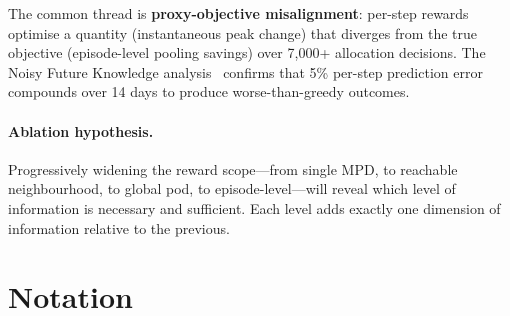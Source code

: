 \documentclass[11pt]{article}
\begin{document}
\noindent
The common thread is \textbf{proxy-objective misalignment}: per-step rewards
optimise a quantity (instantaneous peak change) that diverges from the true
objective (episode-level pooling savings) over 7{,}000+ allocation
decisions.  The Noisy Future Knowledge analysis~\cite{futurek} confirms that
5\% per-step prediction error compounds over 14 days to produce
worse-than-greedy outcomes.

\paragraph{Ablation hypothesis.}
Progressively widening the reward scope---from single MPD, to reachable
neighbourhood, to global pod, to episode-level---will reveal which level of
information is necessary and sufficient.  Each level adds exactly one
dimension of information relative to the previous.

\section{Notation}
\label{sec:notation}
\end{document}
